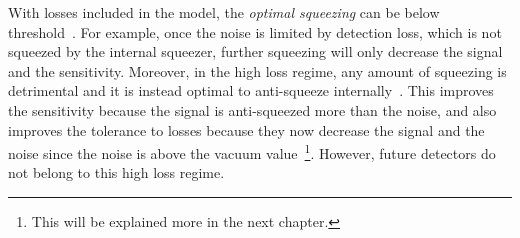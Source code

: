 With losses included in the model, the \emph{optimal squeezing} can be below threshold~\cite{korobkoCompensatingQuantumDecoherenceTalk2021}. For example, once the noise is limited by detection loss, which is not squeezed by the internal squeezer, further squeezing will only decrease the signal and the sensitivity. Moreover, in the high loss regime, any amount of squeezing is detrimental and it is instead optimal to anti-squeeze internally~\cite{korobkoCompensatingQuantumDecoherenceTalk2021}. This improves the sensitivity because the signal is anti-squeezed more than the noise, and also improves the tolerance to losses because they now decrease the signal and the noise since the noise is above the vacuum value~\footnote{This will be explained more in the next chapter.}. However, future detectors do not belong to this high loss regime. %


